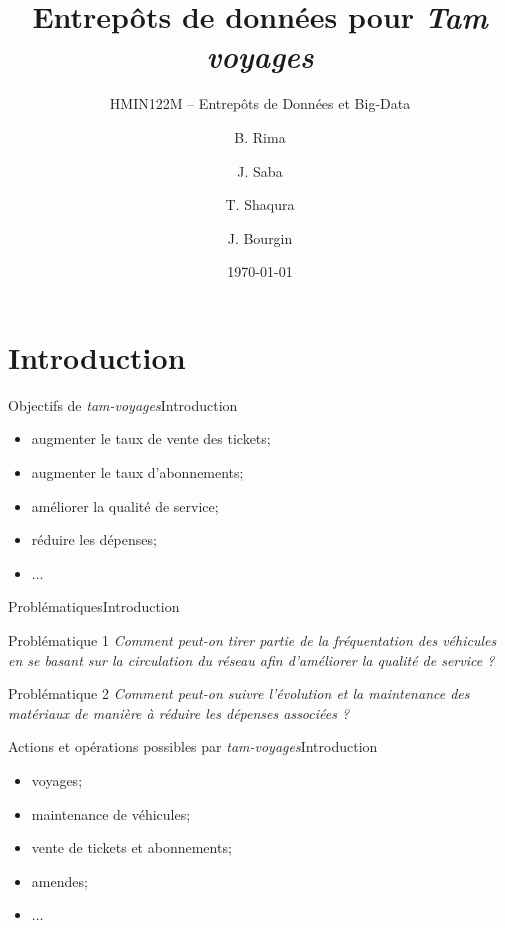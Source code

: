 \documentclass[a4paper,12pt,usenames,dvipsnames]{beamer}
\title{Entrepôts de données pour \textit{Tam voyages}}
\subtitle{HMIN122M -- Entrepôts de Données et Big-Data}
\author{B. Rima \and J. Saba \and T. Shaqura \and J. Bourgin}
\institute[UM]{M1 Informatique AIGLE}
\date{\today}
\begin{document}
\begin{frame}
\titlepage
\end{frame}
\section{Introduction}
\begin{frame}{Objectifs de \textit{tam-voyages}}{Introduction}
\begin{itemize}
  \item<1-> augmenter le taux de vente des tickets;
  \item<2-> augmenter le taux d'abonnements;
  \item<3-> améliorer la qualité de service;
  \item<4-> réduire les dépenses;
  \item<5-> $\dots$
\end{itemize}
\end{frame}

\begin{frame}{Problématiques}{Introduction}
  \begin{block}{Problématique 1}
    \og \textit{Comment peut-on tirer partie de la fréquentation des véhicules en se basant sur la circulation du réseau afin d'améliorer la qualité de service ?} \fg
  \end{block}

  \begin{block}{Problématique 2}
    \og \textit{Comment peut-on suivre l'évolution et la maintenance des matériaux de manière à réduire les dépenses associées ?} \fg
  \end{block}
\end{frame}

\begin{frame}{Actions et opérations possibles par \textit{tam-voyages}}{Introduction}
  \begin{itemize}
    \item<1-> \textcolor{OliveGreen}{voyages};
    \item<2-> \textcolor{OliveGreen}{maintenance de véhicules};
    \item<3-> vente de tickets et abonnements;
    \item<4-> amendes;
    \item<5-> $\dots$
  \end{itemize}
\end{frame}
\end{document}
